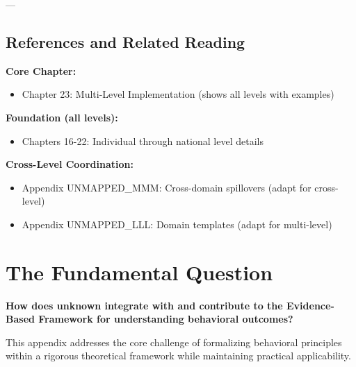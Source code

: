 ---


\subsection*{References and Related Reading}

\textbf{Core Chapter:}
\begin{itemize}[nosep]
\item Chapter 23: Multi-Level Implementation (shows all levels with examples)
\end{itemize}

\textbf{Foundation (all levels):}
\begin{itemize}[nosep]
\item Chapters 16-22: Individual through national level details
\end{itemize}

\textbf{Cross-Level Coordination:}
\begin{itemize}[nosep]
\item Appendix UNMAPPED_MMM: Cross-domain spillovers (adapt for cross-level)
\item Appendix UNMAPPED_LLL: Domain templates (adapt for multi-level)
\end{itemize}



\section{The Fundamental Question}
\label{sec:nnn-fundamental}

\begin{tcolorbox}[
    colback=red!5!white,
    colframe=red!75!black,
    title={\textbf{Fundamental Question}}
]
\textbf{How does unknown integrate with and contribute to the
Evidence-Based Framework for understanding behavioral outcomes?}

This appendix addresses the core challenge of formalizing behavioral principles
within a rigorous theoretical framework while maintaining practical applicability.
\end{tcolorbox}


